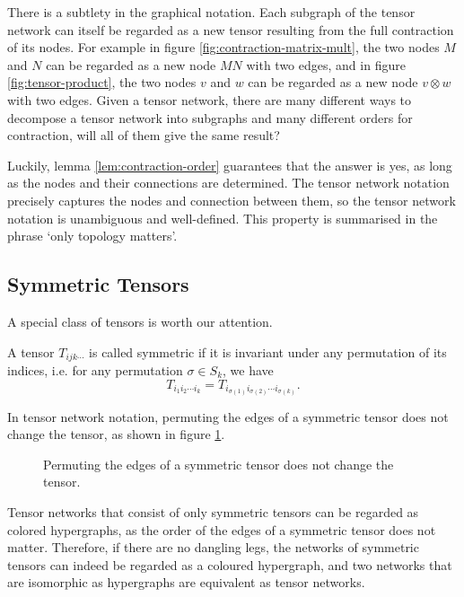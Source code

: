 There is a subtlety in the graphical notation.
Each subgraph of the tensor network can itself be regarded as a new tensor resulting from the full contraction of its nodes.
For example in figure \ref{fig:contraction-matrix-mult}, the two nodes $M$ and $N$ can be regarded as a new node $MN$ with two edges, and in figure \ref{fig:tensor-product}, the two nodes $v$ and $w$ can be regarded as a new node $v \otimes w$ with two edges.
Given a tensor network, there are many different ways to decompose a tensor network into subgraphs and many different orders for contraction, will all of them give the same result?

Luckily, lemma \ref{lem:contraction-order} guarantees that the answer is yes, as long as the nodes and their connections are determined.
The tensor network notation precisely captures the nodes and connection between them, so the tensor network notation is unambiguous and well-defined.
This property is summarised in the phrase `only topology matters'.

\subsection{Symmetric Tensors}

A special class of tensors is worth our attention. 

\begin{definition}
	A tensor $T_{ijk\cdots}$ is called symmetric if it is invariant under any permutation of its indices, i.e. for any permutation $\sigma \in S_k$, we have
	$$
		T_{i_1 i_2 \cdots i_k} = T_{i_{\sigma(1)} i_{\sigma(2)} \cdots i_{\sigma(k)}}.
	$$
\end{definition}\label{def:symmetric-tensor}

In tensor network notation, permuting the edges of a symmetric tensor does not change the tensor, as shown in figure \ref{fig:symmetric-tensor}.

\begin{figure}[ht]
	\centering
	
	\caption{Permuting the edges of a symmetric tensor does not change the tensor.}
	\label{fig:symmetric-tensor}
\end{figure}

Tensor networks that consist of only symmetric tensors can be regarded as colored hypergraphs, as the order of the edges of a symmetric tensor does not matter.
Therefore, if there are no dangling legs, the networks of symmetric tensors can indeed be regarded as a coloured hypergraph, and two networks that are isomorphic as hypergraphs are equivalent as tensor networks.

